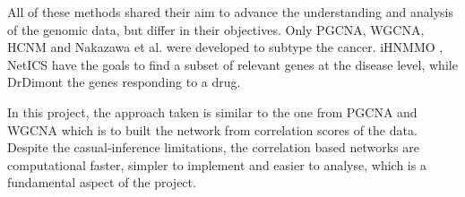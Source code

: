 All of these methods shared their aim to advance the understanding and analysis of the genomic data, but differ in their objectives. Only PGCNA, WGCNA, HCNM and Nakazawa et al.\cite{Care2019-ij, Langfelder2008-sn, Nakazawa2021-yq,  Vangimalla2021-fc} were developed to subtype the cancer. iHNMMO \cite{Peng2017-ik}, NetICS \cite{Dimitrakopoulos2018-br} have the goals to find a subset of relevant genes at the disease level, while DrDimont \cite{Hiort2022-lk} the genes responding to a drug. 

In this project, the approach taken is similar to the one from PGCNA and WGCNA which is to built the network from correlation scores of the data. Despite the casual-inference limitations, the correlation based networks are computational faster, simpler to implement and easier to analyse, which is a fundamental aspect of the project.


